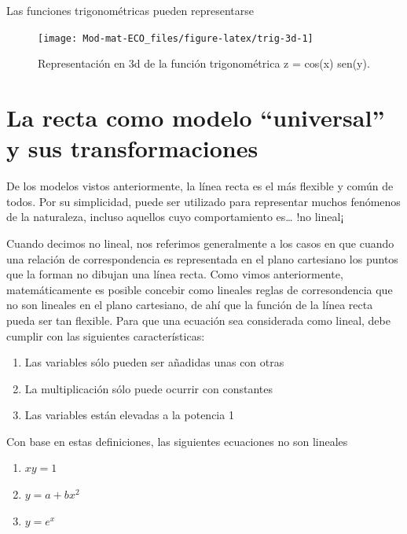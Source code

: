 \documentclass[
]{book}
\providecommand{\tightlist}{%
  \setlength{\itemsep}{0pt}\setlength{\parskip}{0pt}}
\begin{document}
Las funciones trigonométricas pueden representarse

\begin{figure}

{\centering \texttt{[image: Mod-mat-ECO\_files/figure-latex/trig-3d-1]} 

}

\caption{Representación en 3d de la función trigonométrica z = cos(x) sen(y).}\label{fig:trig-3d}
\end{figure}

\hypertarget{la-recta-como-modelo-universal-y-sus-transformaciones}{%
\section{La recta como modelo ``universal'' y sus transformaciones}\label{la-recta-como-modelo-universal-y-sus-transformaciones}}

De los modelos vistos anteriormente, la línea recta es el más flexible y común de todos. Por su simplicidad, puede ser utilizado para representar muchos fenómenos de la naturaleza, incluso aquellos cuyo comportamiento es\ldots{} !no lineal¡

Cuando decimos no lineal, nos referimos generalmente a los casos en que cuando una relación de correspondencia es representada en el plano cartesiano los puntos que la forman no dibujan una línea recta. Como vimos anteriormente, matemáticamente es posible concebir como lineales reglas de corresondencia que no son lineales en el plano cartesiano, de ahí que la función de la línea recta pueda ser tan flexible. Para que una ecuación sea considerada como lineal, debe cumplir con las siguientes características:

\begin{enumerate}
\def\labelenumi{\arabic{enumi}.}
\tightlist
\item
  Las variables sólo pueden ser añadidas unas con otras
\item
  La multiplicación sólo puede ocurrir con constantes
\item
  Las variables están elevadas a la potencia 1
\end{enumerate}

Con base en estas definiciones, las siguientes ecuaciones no son lineales

\begin{enumerate}
\def\labelenumi{\arabic{enumi}.}
\tightlist
\item
  \(xy = 1\)
\item
  \(y = a + b x^2\)
\item
  \(y = e^x\)
\end{enumerate}
\end{document}
